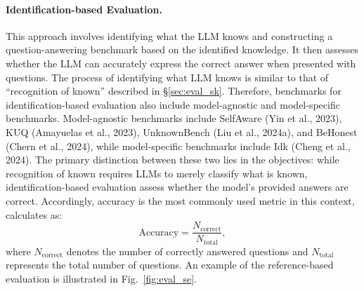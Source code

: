 \paragraph{Identification-based Evaluation.} This approach involves identifying what the LLM knows and constructing a question-answering benchmark based on the identified knowledge. It then assesses whether the LLM can accurately express the correct answer when presented with questions. The process of identifying what LLM knows is similar to that of ``recognition of known'' described in \S\ref{sec:eval_sk}. Therefore, benchmarks for identification-based evaluation also include model-agnostic and model-specific benchmarks. Model-agnostic benchmarks include SelfAware (Yin et al., 2023), KUQ (Amayuelas et al., 2023), UnknownBench (Liu et al., 2024a), and BeHonest (Chern et al., 2024), while model-specific benchmarks include Idk (Cheng et al., 2024). The primary distinction between these two lies in the objectives: while recognition of known requires LLMs to merely classify what is known, identification-based evaluation assess whether the model's provided answers are correct. Accordingly, accuracy is the most commonly used metric in this context, calculates as:
\begin{equation}
\text{Accuracy} = \frac{N_{\text{correct}}}{N_{\text{total}}},
\end{equation}
where $N_{\text{correct}}$ denotes the number of correctly answered questions and $N_{\text{total}}$ represents the total number of questions. An example of the reference-based evaluation is illustrated in Fig.~\ref{fig:eval_se}.

